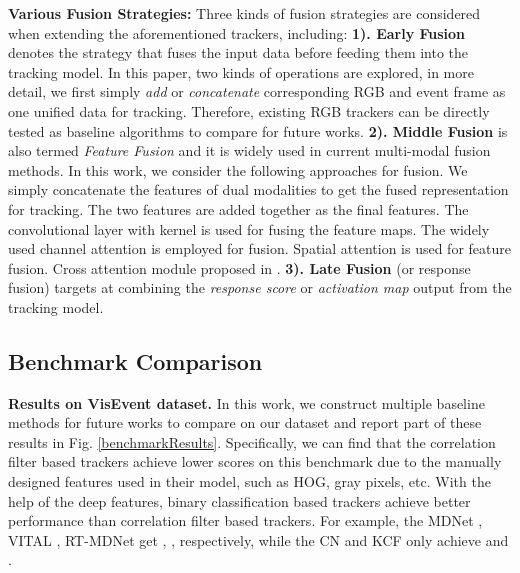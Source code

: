 \documentclass[journal]{IEEEtran}
\begin{document}
\textbf{ Various Fusion Strategies: }  
Three kinds of fusion strategies are considered when extending the aforementioned trackers, including: 
\textbf{1). Early Fusion} denotes the strategy that fuses the input data before feeding them into the tracking model. In this paper, two kinds of operations are explored, in more detail, we first simply \emph{add} or  \emph{concatenate} corresponding RGB and event frame as one unified data for tracking. Therefore, existing RGB trackers can be directly tested as baseline algorithms to compare for future works. 
\textbf{2). Middle Fusion} is also termed \emph{Feature Fusion} and it is widely used in current multi-modal fusion methods. In this work, we consider the following approaches for fusion. 
 We simply concatenate the features of dual modalities to get the fused representation for tracking. 
	The two features are added together as the final features. 
 The convolutional layer with kernel   is used for fusing the feature maps. 
	The widely used channel attention is employed for fusion. 
  Spatial attention is used for feature fusion. 
  Cross attention module proposed in \cite{suo2021CAM}. 
\textbf{3). Late Fusion}  (or response fusion) targets at combining the \emph{response score} or \emph{activation map} output from the tracking model. 



\subsection{Benchmark Comparison}  

\textbf{ Results on VisEvent dataset.}
In this work, we construct multiple baseline methods for future works to compare on our dataset and report part of these results in Fig. \ref{benchmarkResults}. Specifically, we can find that the correlation filter based trackers achieve lower scores on this benchmark due to the manually designed features used in their model, such as HOG, gray pixels, etc. With the help of the deep features, binary classification based trackers achieve better performance than correlation filter based trackers. For example, the MDNet \cite{Nam2015Learning}, VITAL \cite{song2018vital}, RT-MDNet \cite{Jung_2018_ECCV} get , ,  respectively, while the CN \cite{danelljan2014CN} and KCF \cite{Henriques2015High} only achieve  and . 
\end{document}
